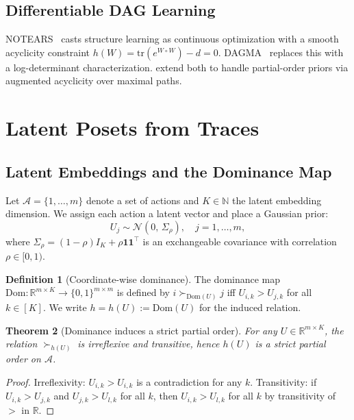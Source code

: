\documentclass{article}
\newtheorem{theorem}{Theorem}
\theoremstyle{definition}
\newtheorem{definition}[theorem]{Definition}
\theoremstyle{remark}
\newcommand{\R}{\mathbb{R}}
\newcommand{\N}{\mathbb{N}}
\newcommand{\Dom}{\mathrm{Dom}}
\newcommand{\tr}{\mathrm{tr}}
\providecommand{\coloneqq}{:=}
\begin{document}
\subsection{Differentiable DAG Learning}
NOTEARS~\citep{zheng2018notears} casts structure learning as continuous
optimization with a smooth acyclicity constraint $h(W)=\tr(e^{W\circ W})-d=0$.
DAGMA~\citep{bello2022dagma} replaces this with a log-determinant characterization.
\citet{ban2024differentiable} extend both to handle partial-order priors
via augmented acyclicity over maximal paths.

\section{Latent Posets from Traces}
\label{sec:model}

\subsection{Latent Embeddings and the Dominance Map}
\label{sec:dominance}
Let $\mathcal{A}=\{1,\dots,m\}$ denote a set of actions and
$K\in\N$ the latent embedding dimension.
We assign each action a latent vector and place a Gaussian prior:
\begin{equation}
U_j \sim \mathcal{N}(0,\,\Sigma_\rho),\quad j=1,\dots,m,
\label{eq:prior_U}
\end{equation}
where $\Sigma_\rho=(1-\rho)I_K+\rho\mathbf{1}\mathbf{1}^\top$ is an
exchangeable covariance with correlation $\rho\in[0,1)$.

\begin{definition}[Coordinate-wise dominance]
\label{def:dominance}
The dominance map $\Dom:\R^{m\times K}\to\{0,1\}^{m\times m}$ is defined by
$i\succ_{\Dom(U)}j$ iff $U_{i,k}>U_{j,k}$ for all $k\in[K]$.
We write $h=h(U)\coloneqq\Dom(U)$ for the induced relation.
\end{definition}

\begin{theorem}[Dominance induces a strict partial order]
\label{thm:spo}
For any $U\in\R^{m\times K}$, the relation $\succ_{h(U)}$ is irreflexive
and transitive, hence $h(U)$ is a strict partial order on $\mathcal{A}$.
\end{theorem}
\begin{proof}
Irreflexivity: $U_{i,k}>U_{i,k}$ is a contradiction for any $k$.
Transitivity: if $U_{i,k}>U_{j,k}$ and $U_{j,k}>U_{l,k}$ for all $k$,
then $U_{i,k}>U_{l,k}$ for all $k$ by transitivity of $>$ in $\R$.
\end{proof}
\end{document}
